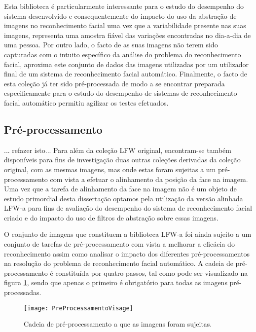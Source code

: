 Esta biblioteca é particularmente interessante para o estudo do desempenho do sistema desenvolvido e consequentemente do impacto do uso da abstração de imagens no reconhecimento facial uma vez que a variabilidade presente nas suas imagens, representa uma amostra fiável das variações encontradas no dia-a-dia de uma pessoa. Por outro lado, o facto de as suas imagens não terem sido capturadas com o intuito específico da análise do problema do reconhecimento facial, aproxima este conjunto de dados das imagens utilizadas por um utilizador final de um sistema de reconhecimento facial automático. Finalmente, o facto de esta coleção já ter sido pré-processada de modo a se encontrar preparada especificamente para o estudo do desempenho de sistemas de reconhecimento facial automático permitiu agilizar os testes efetuados.

\subsection{Pré-processamento}  \label{sec:preprocessamento}
... refazer isto...
Para além da coleção LFW original, encontram-se também disponíveis para fins de investigação duas outras coleções derivadas da coleção original, com as mesmas imagens, mas onde estas foram sujeitas a um pré-processamento com vista a efetuar o alinhamento da posição da face na imagem. Uma vez que a tarefa de alinhamento da face na imagem não é um objeto de estudo primordial desta dissertação optamos pela utilização da versão alinhada LFW-a \citep{autor} para fins de avaliação do desempenho do sistema de reconhecimento facial criado e do impacto do uso de filtros de abstração sobre essas imagens.

O conjunto de imagens que constituem a biblioteca LFW-a foi ainda sujeito a um conjunto de tarefas de pré-processamento com vista a melhorar a eficácia do reconhecimento assim como analisar o impacto dos diferentes pré-processamentos na resolução do problema de reconhecimento facial automático. A cadeia de pré-processamento é constituída por quatro passos, tal como pode ser visualizado na figura \ref{fig:preprocessamento}, sendo que apenas o primeiro é obrigatório para todas as imagens pré-processadas.

\begin{figure}[ht]
  \begin{center}
    \leavevmode
    \texttt{[image: PreProcessamentoVisage]}
    \caption{Cadeia de pré-processamento a que as imagens foram sujeitas.}
    \label{fig:preprocessamento}
  \end{center}
\end{figure}

